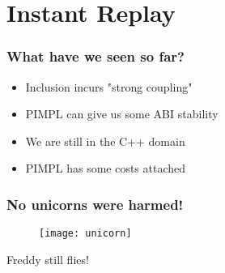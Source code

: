\section{Instant Replay}

\begin{frame}[c]
  \frametitle{What have we seen so far?}
  \pause{}
  \begin{itemize}
    \item{Inclusion incurs "strong coupling"}\pause{}
    \item{PIMPL can give us some ABI stability}\pause{}
    \item{We are still in the C++ domain}\pause{}
    \item{PIMPL has some costs attached}
  \end{itemize}
\end{frame}

\begin{frame}[c]
  \frametitle{No unicorns were harmed!}
  \begin{centering}
    \begin{figure}
      \texttt{[image: unicorn]}
    \end{figure}
    \Large{Freddy still flies!}\\
  \end{centering}

\end{frame}

